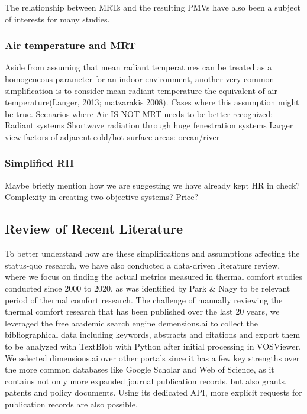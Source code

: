     The relationship between MRTs and the resulting PMVs have also been a subject of interests for many studies. 
\subsubsection{Air temperature and MRT}
        Aside from assuming that mean radiant temperatures can be treated as a homogeneous parameter for an indoor environment, another very common simplification is to consider mean radiant temperature the equivalent of air temperature\cite{kantor_most_2011}(Langer, 2013; matzarakis 2008). 
                Cases where this assumption might be true.
            Scenarios where Air IS NOT MRT needs to be better recognized:
            Radiant systems
            Shortwave radiation through huge fenestration systems
            Larger view-factors of adjacent cold/hot surface areas: ocean/river
\subsubsection{Simplified RH}
        Maybe briefly mention how we are suggesting we have already kept HR in check?
        Complexity in creating two-objective systems? Price?

\subsection{Review of Recent Literature}
    To better understand how are these simplifications and assumptions affecting the status-quo research, we have also conducted a data-driven literature review, where we focus on finding the actual metrics measured in thermal comfort studies conducted since 2000 to 2020, as was identified by Park \& Nagy \cite{park_comprehensive_2018} to be relevant period of thermal comfort research. The challenge of manually reviewing the thermal comfort research that has been published over the last 20 years, we leveraged the free academic search engine demensions.ai to collect the bibliographical data including keywords, abstracts and citations and export them to be analyzed with TextBlob with Python after initial processing in VOSViewer. We selected dimensions.ai over other portals since it has a few key strengths over the more common databases like Google Scholar and Web of Science, as it contains not only more expanded journal publication records, but also grants, patents and policy documents. Using its dedicated API, more explicit requests for publication records are also possible. 


